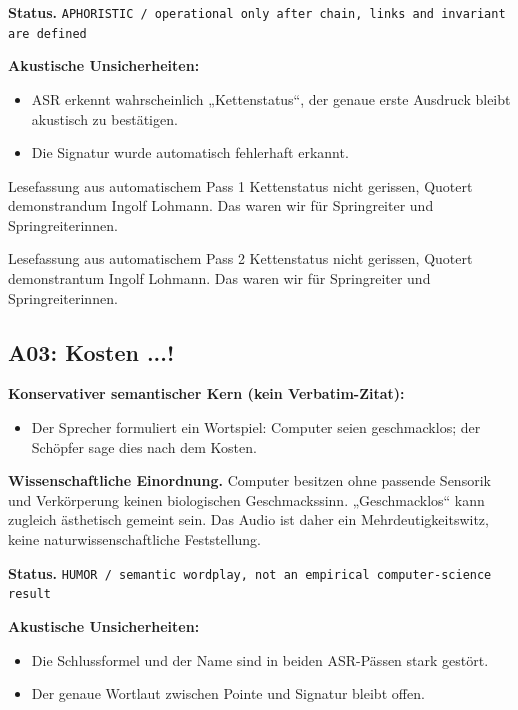 \documentclass[11pt,a4paper]{article}
\newcommand{\status}[1]{\texttt{#1}}
\begin{document}
\textbf{Status.} \status{APHORISTIC / operational only after chain, links and invariant are defined}

\textbf{Akustische Unsicherheiten:}
\begin{itemize}
\item ASR erkennt wahrscheinlich „Kettenstatus“, der genaue erste Ausdruck bleibt akustisch zu bestätigen.
\item Die Signatur wurde automatisch fehlerhaft erkannt.
\end{itemize}

\begin{asrbox}{Lesefassung aus automatischem Pass 1}
Kettenstatus nicht gerissen, Quotert demonstrandum Ingolf Lohmann. Das waren wir für Springreiter und Springreiterinnen.
\end{asrbox}

\begin{asrbox}{Lesefassung aus automatischem Pass 2}
Kettenstatus nicht gerissen, Quotert demonstrantum Ingolf Lohmann. Das waren wir für Springreiter und Springreiterinnen.
\end{asrbox}


\subsection{A03: Kosten ...!}
\label{sec:a03}
\textbf{Konservativer semantischer Kern (kein Verbatim-Zitat):}
\begin{itemize}
\item Der Sprecher formuliert ein Wortspiel: Computer seien geschmacklos; der Schöpfer sage dies nach dem Kosten.
\end{itemize}

\textbf{Wissenschaftliche Einordnung.} Computer besitzen ohne passende Sensorik und Verkörperung keinen biologischen Geschmackssinn. „Geschmacklos“ kann zugleich ästhetisch gemeint sein. Das Audio ist daher ein Mehrdeutigkeitswitz, keine naturwissenschaftliche Feststellung.

\textbf{Status.} \status{HUMOR / semantic wordplay, not an empirical computer-science result}

\textbf{Akustische Unsicherheiten:}
\begin{itemize}
\item Die Schlussformel und der Name sind in beiden ASR-Pässen stark gestört.
\item Der genaue Wortlaut zwischen Pointe und Signatur bleibt offen.
\end{itemize}
\end{document}
